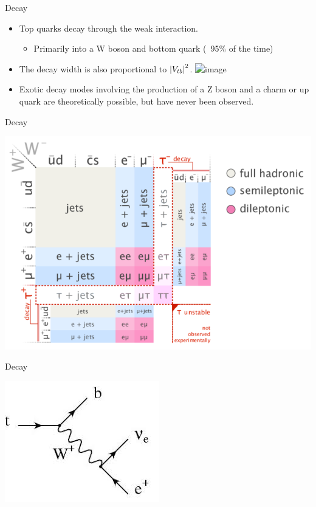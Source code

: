 \documentclass{beamer}
\begin{document}
\begin{frame}{Decay}
    \begin{itemize}
        \item<1-> Top quarks decay through the weak interaction.
        \begin{itemize}
            \item<2-> Primarily into a W boson and bottom quark (~95\% of the time)
        \end{itemize}
        \item<3-> The decay width is also proportional to $\abs{V_{tb}}^2$.
        \includegraphics<4->[scale=1]{images/width_calc.PNG}
        \item<5-> Exotic decay modes involving the production of a Z boson and a charm or up quark are theoretically possible, but have never been observed.
    \end{itemize}
\end{frame}

\begin{frame}{Decay}
    \begin{center}
        \includegraphics[scale=0.4]{images/decay_types.png}
    \end{center}
\end{frame}

\begin{frame}{Decay}
    \begin{center}
        \includegraphics[scale=0.5]{images/decay.jpg}
    \end{center}
\end{frame}
\end{document}
